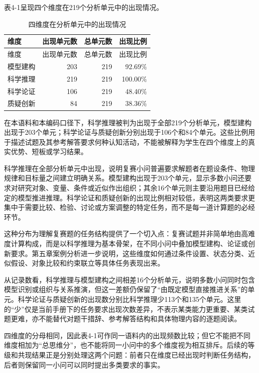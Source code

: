 \documentclass[
  12pt,
  a4paper]{ctexbook}
\begin{document}
表4-1呈现四个维度在219个分析单元中的出现情况。

\begin{longtable}[]{@{}lrrr@{}}
\caption{四维度在分析单元中的出现情况}\tabularnewline
\toprule\noalign{}
\rowcolor{ThesisPale}
维度 & 出现单元数 & 总单元数 & 出现比例 \\
\midrule\noalign{}
\endfirsthead
\toprule\noalign{}
\rowcolor{ThesisPale}
维度 & 出现单元数 & 总单元数 & 出现比例 \\
\midrule\noalign{}
\endhead
\bottomrule\noalign{}
\endlastfoot
模型建构 & 203 & 219 & 92.69\% \\
科学推理 & 219 & 219 & 100.00\% \\
科学论证 & 106 & 219 & 48.40\% \\
质疑创新 & 84 & 219 & 38.36\% \\
\end{longtable}

在本语料和本编码口径下，科学推理被判为出现于全部219个分析单元，模型建构出现于203个单元；科学论证与质疑创新分别出现于106个和84个单元。这些比例用于描述试题及其参考解答要求何种认知活动，不能被解释为学生在四个维度上的真实优势、短板或学习结果。

科学推理在全部分析单元中出现，说明复赛小问普遍要求解题者在题设条件、物理规律和目标量之间建立明确关系。模型建构出现于203个单元，显示多数小问还要求对研究对象、变量、条件或近似作出组织；其余16个单元则主要沿用题目已经给定的模型推进推理。科学论证和质疑创新的出现比例相对较低，表明这两类要求更集中于需要比较、检验、讨论或方案调整的特定任务，而不是每一道计算题的必经环节。

这种分布为理解复赛题的任务结构提供了一个切入点：复赛试题并非简单地由高难度计算构成，而是以科学推理为基本骨架，在不同小问中叠加模型建构、论证或创新要求。第五章案例分析进一步说明，这些维度如何通过条件设置、状态分类、近似假设、对象比较和约束联立等具体任务表现出来。

从记录数看，科学推理与模型建构之间相差16个分析单元，说明多数小问同时包含模型识别或组织与关系推演，但这一差额仍保留了``由既定模型直接推进关系''的单元。科学论证与质疑创新的出现数分别比科学推理少113个和135个单元。这里的``少''仅是当前手册下的任务要求出现次数差异，不表示某类能力更重要、某类试题更难，亦不能替代对题干措辞、参考解答结构和具体物理内容的逐题阅读。

四维度的分母相同，因此表4-1可作同一语料内的出现频数比较；但它不能把不同维度相加为``总思维分''，也不能将同一小问中的多个维度视为相互排斥。后续的等级和共现结果正是分别处理这两个问题：前者只在维度已经出现时判断任务结构，后者则保留同一小问可以同时提出多类要求的事实。
\end{document}
